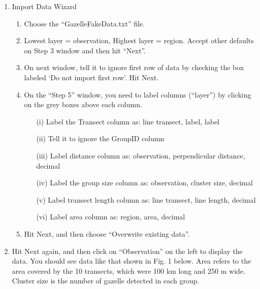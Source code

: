 \documentclass[12pt]{article}\usepackage[]{graphicx}\usepackage[]{color}
\begin{document}
\begin{enumerate}
  \item Import Data Wizard
  \begin{enumerate}
    \item Choose the ``GazelleFakeData.txt'' file. %
    \item Lowest layer = observation, Highest layer = region. Accept
      other defaults on Step 3 window and then hit ``Next''. 
    \item On next window, tell it to ignore first row of data by
      checking the box labeled `Do not import first row'. Hit Next. 
    \item On the ``Step 5'' window, you need to label columns
      (``layer'') by clicking on the grey boxes above each column. 
      \begin{itemize}
        \item[(i)] Label the Transect column as: line transect, label,
          label  
        \item[(ii)] Tell it to ignore the GroupID column
        \item[(iii)] Label distance column as: observation, perpendicular
          distance, decimal 
        \item[(iv)] Label the group size column as: observation, cluster
          size, decimal 
        \item[(v)] Label transect length column as: line transect, line
          length, decimal 
        \item[(vi)] Label area column as: region, area, decimal
      \end{itemize}
    \item Hit Next, and then choose ``Overwrite existing data''. 
  \end{enumerate}
  \item Hit Next again, and then click on ``Observation'' on the left to
    display the data. You should see data like that shown in Fig. 1
    below. Area refers to the area covered by the 10 transects,
    which were 100 km long and 250 m wide. Cluster size is the number
    of gazelle detected in each group. 
\end{enumerate}
\end{document}

